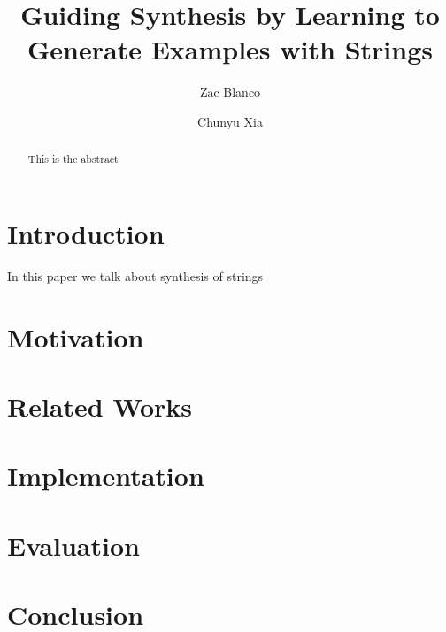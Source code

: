 \documentclass[sigconf,authordraft]{acmart}
\begin{document}
\title{Guiding Synthesis by Learning to Generate Examples with Strings}
\author{Zac Blanco}

\author{Chunyu Xia}


\begin{abstract}
This is the abstract
\end{abstract}

\maketitle

\section{Introduction}

In this paper we talk about synthesis of strings


\section{Motivation}

\section{Related Works}

\section{Implementation}

\section{Evaluation}

\section{Conclusion}
\end{document}
